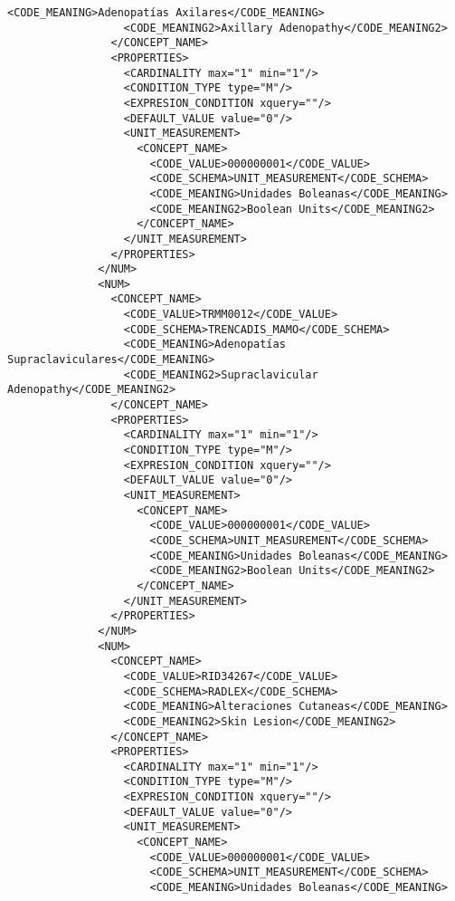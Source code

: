\begin{lstlisting}[label=some-code,caption=Some Code]
                  <CODE_MEANING>Adenopatías Axilares</CODE_MEANING>
                  <CODE_MEANING2>Axillary Adenopathy</CODE_MEANING2>
                </CONCEPT_NAME>
                <PROPERTIES>
                  <CARDINALITY max="1" min="1"/>
                  <CONDITION_TYPE type="M"/>
                  <EXPRESION_CONDITION xquery=""/>
                  <DEFAULT_VALUE value="0"/>
                  <UNIT_MEASUREMENT>
                    <CONCEPT_NAME>
                      <CODE_VALUE>000000001</CODE_VALUE>
                      <CODE_SCHEMA>UNIT_MEASUREMENT</CODE_SCHEMA>
                      <CODE_MEANING>Unidades Boleanas</CODE_MEANING>
                      <CODE_MEANING2>Boolean Units</CODE_MEANING2>
                    </CONCEPT_NAME>
                  </UNIT_MEASUREMENT>
                </PROPERTIES>
              </NUM>
              <NUM>
                <CONCEPT_NAME>
                  <CODE_VALUE>TRMM0012</CODE_VALUE>
                  <CODE_SCHEMA>TRENCADIS_MAMO</CODE_SCHEMA>
                  <CODE_MEANING>Adenopatías Supraclaviculares</CODE_MEANING>
                  <CODE_MEANING2>Supraclavicular Adenopathy</CODE_MEANING2>
                </CONCEPT_NAME>
                <PROPERTIES>
                  <CARDINALITY max="1" min="1"/>
                  <CONDITION_TYPE type="M"/>
                  <EXPRESION_CONDITION xquery=""/>
                  <DEFAULT_VALUE value="0"/>
                  <UNIT_MEASUREMENT>
                    <CONCEPT_NAME>
                      <CODE_VALUE>000000001</CODE_VALUE>
                      <CODE_SCHEMA>UNIT_MEASUREMENT</CODE_SCHEMA>
                      <CODE_MEANING>Unidades Boleanas</CODE_MEANING>
                      <CODE_MEANING2>Boolean Units</CODE_MEANING2>
                    </CONCEPT_NAME>
                  </UNIT_MEASUREMENT>
                </PROPERTIES>
              </NUM>
              <NUM>
                <CONCEPT_NAME>
                  <CODE_VALUE>RID34267</CODE_VALUE>
                  <CODE_SCHEMA>RADLEX</CODE_SCHEMA>
                  <CODE_MEANING>Alteraciones Cutaneas</CODE_MEANING>
                  <CODE_MEANING2>Skin Lesion</CODE_MEANING2>
                </CONCEPT_NAME>
                <PROPERTIES>
                  <CARDINALITY max="1" min="1"/>
                  <CONDITION_TYPE type="M"/>
                  <EXPRESION_CONDITION xquery=""/>
                  <DEFAULT_VALUE value="0"/>
                  <UNIT_MEASUREMENT>
                    <CONCEPT_NAME>
                      <CODE_VALUE>000000001</CODE_VALUE>
                      <CODE_SCHEMA>UNIT_MEASUREMENT</CODE_SCHEMA>
                      <CODE_MEANING>Unidades Boleanas</CODE_MEANING>

\end{lstlisting}
